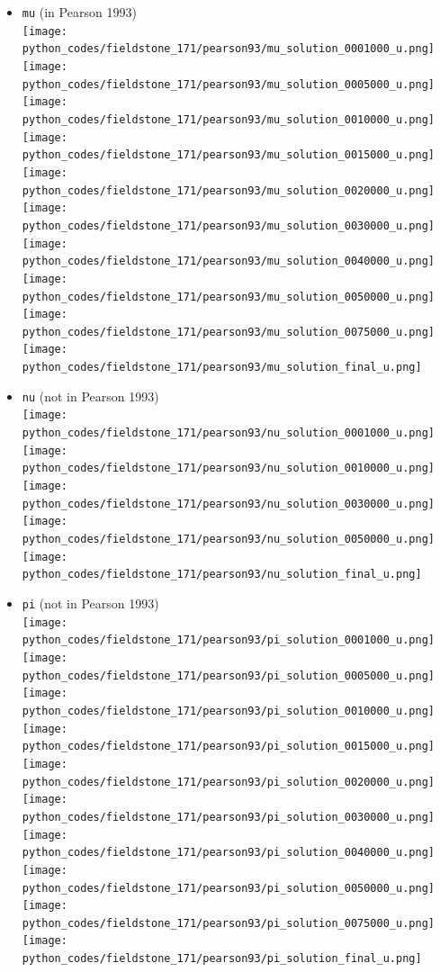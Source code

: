 \begin{itemize}
\item {\tt mu} (in Pearson 1993)\\
\texttt{[image: python\_codes/fieldstone\_171/pearson93/mu\_solution\_0001000\_u.png]}
\texttt{[image: python\_codes/fieldstone\_171/pearson93/mu\_solution\_0005000\_u.png]}
\texttt{[image: python\_codes/fieldstone\_171/pearson93/mu\_solution\_0010000\_u.png]}
\texttt{[image: python\_codes/fieldstone\_171/pearson93/mu\_solution\_0015000\_u.png]}
\texttt{[image: python\_codes/fieldstone\_171/pearson93/mu\_solution\_0020000\_u.png]}
\texttt{[image: python\_codes/fieldstone\_171/pearson93/mu\_solution\_0030000\_u.png]}
\texttt{[image: python\_codes/fieldstone\_171/pearson93/mu\_solution\_0040000\_u.png]}
\texttt{[image: python\_codes/fieldstone\_171/pearson93/mu\_solution\_0050000\_u.png]}
\texttt{[image: python\_codes/fieldstone\_171/pearson93/mu\_solution\_0075000\_u.png]}
\texttt{[image: python\_codes/fieldstone\_171/pearson93/mu\_solution\_final\_u.png]}

\item {\tt nu} (not in Pearson 1993)\\
\texttt{[image: python\_codes/fieldstone\_171/pearson93/nu\_solution\_0001000\_u.png]}
\texttt{[image: python\_codes/fieldstone\_171/pearson93/nu\_solution\_0010000\_u.png]}
\texttt{[image: python\_codes/fieldstone\_171/pearson93/nu\_solution\_0030000\_u.png]}
\texttt{[image: python\_codes/fieldstone\_171/pearson93/nu\_solution\_0050000\_u.png]}
\texttt{[image: python\_codes/fieldstone\_171/pearson93/nu\_solution\_final\_u.png]}

\item {\tt pi} (not in Pearson 1993)\\
\texttt{[image: python\_codes/fieldstone\_171/pearson93/pi\_solution\_0001000\_u.png]}
\texttt{[image: python\_codes/fieldstone\_171/pearson93/pi\_solution\_0005000\_u.png]}
\texttt{[image: python\_codes/fieldstone\_171/pearson93/pi\_solution\_0010000\_u.png]}
\texttt{[image: python\_codes/fieldstone\_171/pearson93/pi\_solution\_0015000\_u.png]}
\texttt{[image: python\_codes/fieldstone\_171/pearson93/pi\_solution\_0020000\_u.png]}
\texttt{[image: python\_codes/fieldstone\_171/pearson93/pi\_solution\_0030000\_u.png]}
\texttt{[image: python\_codes/fieldstone\_171/pearson93/pi\_solution\_0040000\_u.png]}
\texttt{[image: python\_codes/fieldstone\_171/pearson93/pi\_solution\_0050000\_u.png]}
\texttt{[image: python\_codes/fieldstone\_171/pearson93/pi\_solution\_0075000\_u.png]}
\texttt{[image: python\_codes/fieldstone\_171/pearson93/pi\_solution\_final\_u.png]}


\end{itemize}

